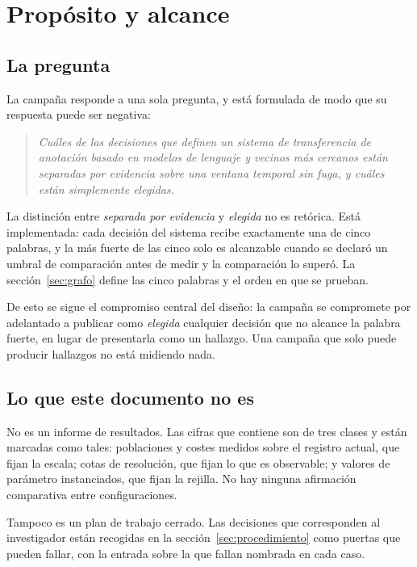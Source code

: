 \section{Propósito y alcance}
\label{sec:proposito}

\subsection{La pregunta}

La campaña responde a una sola pregunta, y está formulada de modo que su
respuesta puede ser negativa:

\begin{quote}
\emph{Cuáles de las decisiones que definen un sistema de transferencia de
anotación basado en modelos de lenguaje y vecinos más cercanos están separadas
por evidencia sobre una ventana temporal sin fuga, y cuáles están simplemente
elegidas.}
\end{quote}

La distinción entre \emph{separada por evidencia} y \emph{elegida} no es
retórica. Está implementada: cada decisión del sistema recibe exactamente una
de cinco palabras, y la más fuerte de las cinco solo es alcanzable cuando se
declaró un umbral de comparación antes de medir y la comparación lo superó. La
sección~\ref{sec:grafo} define las cinco palabras y el orden en que se prueban.

De esto se sigue el compromiso central del diseño: la campaña se compromete por
adelantado a publicar como \emph{elegida} cualquier decisión que no alcance la
palabra fuerte, en lugar de presentarla como un hallazgo. Una campaña que solo
puede producir hallazgos no está midiendo nada.

\subsection{Lo que este documento no es}

No es un informe de resultados. Las cifras que contiene son de tres clases y
están marcadas como tales: poblaciones y costes medidos sobre el registro
actual, que fijan la escala; cotas de resolución, que fijan lo que es
observable; y valores de parámetro instanciados, que fijan la rejilla. No hay
ninguna afirmación comparativa entre configuraciones.

Tampoco es un plan de trabajo cerrado. Las decisiones que corresponden al
investigador están recogidas en la sección~\ref{sec:procedimiento} como puertas
que pueden fallar, con la entrada sobre la que fallan nombrada en cada caso.

